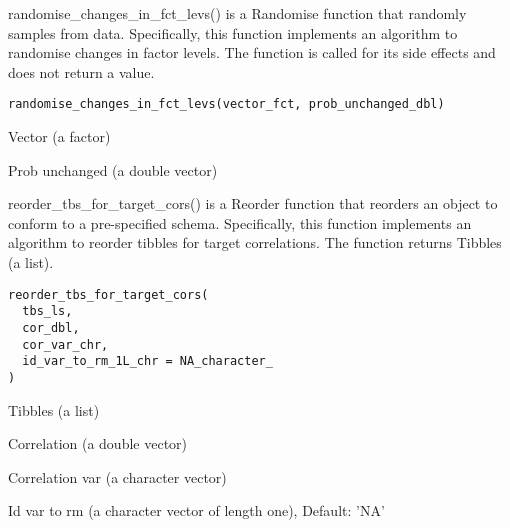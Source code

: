 \documentclass[a4paper]{book}
\begin{document}
%
\begin{Description}\relax
randomise\_changes\_in\_fct\_levs() is a Randomise function that randomly samples from data. Specifically, this function implements an algorithm to randomise changes in factor levels. The function is called for its side effects and does not return a value.
\end{Description}
%
\begin{Usage}
\begin{verbatim}
randomise_changes_in_fct_levs(vector_fct, prob_unchanged_dbl)
\end{verbatim}
\end{Usage}
%
\begin{Arguments}
\begin{ldescription}
\item[\code{vector\_fct}] Vector (a factor)

\item[\code{prob\_unchanged\_dbl}] Prob unchanged (a double vector)
\end{ldescription}
\end{Arguments}
%
\begin{Description}\relax
reorder\_tbs\_for\_target\_cors() is a Reorder function that reorders an object to conform to a pre-specified schema. Specifically, this function implements an algorithm to reorder tibbles for target correlations. The function returns Tibbles (a list).
\end{Description}
%
\begin{Usage}
\begin{verbatim}
reorder_tbs_for_target_cors(
  tbs_ls,
  cor_dbl,
  cor_var_chr,
  id_var_to_rm_1L_chr = NA_character_
)
\end{verbatim}
\end{Usage}
%
\begin{Arguments}
\begin{ldescription}
\item[\code{tbs\_ls}] Tibbles (a list)

\item[\code{cor\_dbl}] Correlation (a double vector)

\item[\code{cor\_var\_chr}] Correlation var (a character vector)

\item[\code{id\_var\_to\_rm\_1L\_chr}] Id var to rm (a character vector of length one), Default: 'NA'
\end{ldescription}
\end{Arguments}
\end{document}
